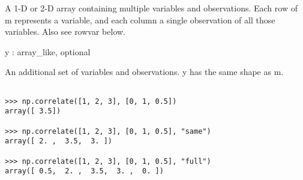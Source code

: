 A 1-D or 2-D array containing multiple variables and observations. 
Each row of m represents a variable, and each column a single observation of all those variables. Also see rowvar below.
 
y : array_like, optional
 


An additional set of variables and observations. y has the same shape as m.
 



\begin{framed}
\begin{verbatim}

>>> np.correlate([1, 2, 3], [0, 1, 0.5])
array([ 3.5])

>>> np.correlate([1, 2, 3], [0, 1, 0.5], "same")
array([ 2. ,  3.5,  3. ])

>>> np.correlate([1, 2, 3], [0, 1, 0.5], "full")
array([ 0.5,  2. ,  3.5,  3. ,  0. ])


\end{verbatim}
\end{framed}
